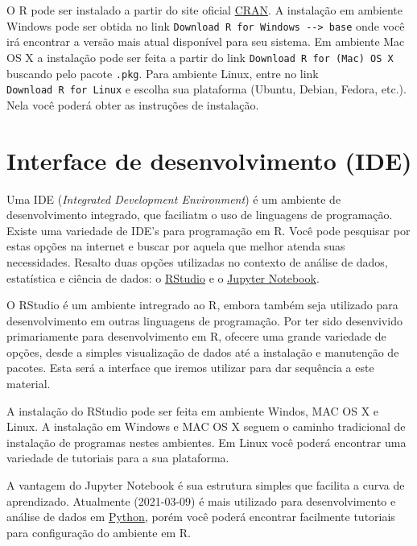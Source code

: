 \documentclass[
]{book}
\begin{document}
O R pode ser instalado a partir do site oficial \href{https://cran.r-project.org/}{CRAN}. A instalação em ambiente Windows pode ser obtida no link \texttt{Download\ R\ for\ Windows\ -\/-\textgreater{}\ base} onde você irá encontrar a versão mais atual disponível para seu sistema. Em ambiente Mac OS X a instalação pode ser feita a partir do link \texttt{Download\ R\ for\ (Mac)\ OS\ X} buscando pelo pacote \texttt{.pkg}. Para ambiente Linux, entre no link \texttt{Download\ R\ for\ Linux} e escolha sua plataforma (Ubuntu, Debian, Fedora, etc.). Nela você poderá obter as instruções de instalação.

\hypertarget{interface-de-desenvolvimento-ide}{%
\section{Interface de desenvolvimento (IDE)}\label{interface-de-desenvolvimento-ide}}

Uma IDE (\emph{Integrated Development Environment}) é um ambiente de desenvolvimento integrado, que faciliatm o uso de linguagens de programação. Existe uma variedade de IDE's para programação em R. Você pode pesquisar por estas opções na internet e buscar por aquela que melhor atenda suas necessidades. Resalto duas opções utilizadas no contexto de análise de dados, estatística e ciência de dados: o \href{https://rstudio.com/}{RStudio} e o \href{https://jupyter.org/index.html}{Jupyter Notebook}.

O RStudio é um ambiente intregrado ao R, embora também seja utilizado para desenvolvimento em outras linguagens de programação. Por ter sido desenvivido primariamente para desenvolvimento em R, ofecere uma grande variedade de opções, desde a simples visualização de dados até a instalação e manutenção de pacotes. Esta será a interface que iremos utilizar para dar sequência a este material.

A instalação do RStudio pode ser feita em ambiente Windos, MAC OS X e Linux. A instalação em Windows e MAC OS X seguem o caminho tradicional de instalação de programas nestes ambientes. Em Linux você poderá encontrar uma variedade de tutoriais para a sua plataforma.

A vantagem do Jupyter Notebook é sua estrutura simples que facilita a curva de aprendizado. Atualmente (2021-03-09) é mais utilizado para desenvolvimento e análise de dados em \href{https://www.python.org/}{Python}, porém você poderá encontrar facilmente tutoriais para configuração do ambiente em R.
\end{document}
